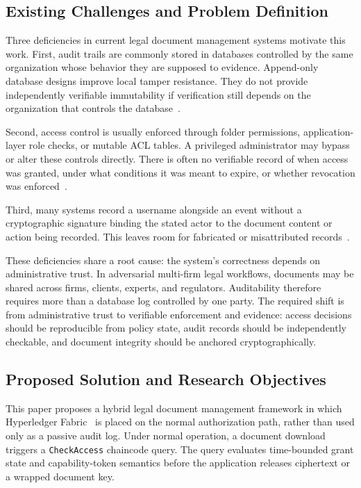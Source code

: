 \documentclass[preprint,12pt]{elsarticle}
\begin{document}
\subsection{Existing Challenges and Problem Definition}
\label{sec:challenges}

Three deficiencies in current legal document management systems motivate this
work. First, audit trails are commonly stored in databases controlled by the
same organization whose behavior they are supposed to evidence. Append-only
database designs improve local tamper resistance. They do not provide
independently verifiable immutability if verification still depends on the
organization that controls the database~\cite{nistir8202}.

Second, access control is usually enforced through folder permissions,
application-layer role checks, or mutable ACL tables. A privileged
administrator may bypass or alter these controls directly. There is often no
verifiable record of when access was granted, under what conditions it was
meant to expire, or whether revocation was enforced~\cite{chainOfCustodySLR2023,cai2023timebound}.

Third, many systems record a username alongside an event without a
cryptographic signature binding the stated actor to the document content or
action being recorded. This leaves room for fabricated or misattributed
records~\cite{arora2019blockchain}.

These deficiencies share a root cause: the system's correctness depends on
administrative trust. In adversarial multi-firm legal workflows, documents may
be shared across firms, clients, experts, and regulators. Auditability
therefore requires more than a database log controlled by one party. The
required shift is from administrative trust to verifiable enforcement and
evidence: access decisions should be reproducible from policy state, audit
records should be independently checkable, and document integrity should be
anchored cryptographically.

\subsection{Proposed Solution and Research Objectives}
\label{sec:solution}

This paper proposes a hybrid legal document management framework in which
Hyperledger Fabric~\cite{androulaki2018hyperledger} is placed on the normal
authorization path, rather than used only as a passive audit log. Under normal
operation, a document download triggers a \texttt{CheckAccess} chaincode query.
The query evaluates time-bounded grant state and capability-token semantics
before the application releases ciphertext or a wrapped document key.
\end{document}
